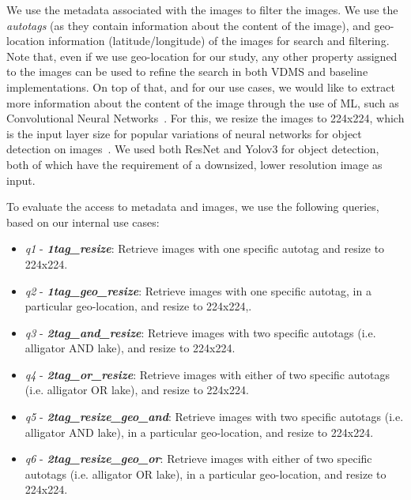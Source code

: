 We use the metadata associated with the images to filter the images.
We use the \textit{autotags} (as they contain information about the content
of the image), and geo-location information (latitude/longitude)
of the images for search and filtering.
Note that, even if we use geo-location for our study, any other property
assigned to the images can be used to refine the search
in both VDMS and baseline implementations.
On top of that, and for our use cases, we would like to extract more information
about the content of the image through the use of ML,
such as Convolutional Neural Networks~\cite{cnn}.
For this, we resize the images to 224x224, which is the input layer size for
popular variations of neural networks for object detection on images~\cite{resnet}.
We used both ResNet and Yolov3 for object detection, both of which
have the requirement of a downsized, lower resolution image as input.

To evaluate the access to metadata and images,
we use the following queries, based on our internal use cases:

\begin{itemize}
\item \textit{q1} - {\bf {\em 1tag\_resize}}: Retrieve images with one specific autotag and resize to 224x224.

\item \textit{q2} - {\bf {\em 1tag\_geo\_resize}}: Retrieve images with one specific autotag, in a particular geo-location, and resize to 224x224,.

\item \textit{q3} - {\bf {\em 2tag\_and\_resize}}: Retrieve images with two specific autotags (i.e. alligator AND lake), and resize to 224x224.

\item \textit{q4} - {\bf {\em 2tag\_or\_resize}}: Retrieve images with either of two specific autotags (i.e. alligator OR lake), and resize to 224x224.

\item \textit{q5} - {\bf {\em 2tag\_resize\_geo\_and}}: Retrieve images with two specific autotags (i.e. alligator AND lake), in a particular geo-location, and resize to 224x224.

\item \textit{q6} - {\bf {\em 2tag\_resize\_geo\_or}}: Retrieve images with either of two specific autotags (i.e. alligator OR lake), in a particular geo-location, and resize to 224x224.

\end{itemize}

